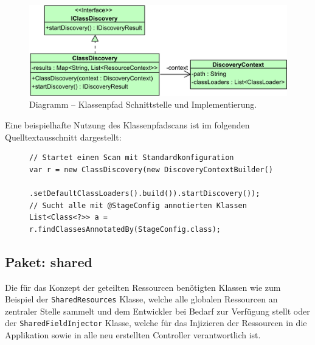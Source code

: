 \begin{figure}[H]
	\centering
	\includegraphics[width=\textwidth-2cm]{Abbildungen/Klassenpfadscan-Discovery.png}
	\caption{Diagramm -- Klassenpfad Schnittstelle und Implementierung.}
	\label{fig:classpath_interface}
\end{figure}
\noindent Eine beispielhafte Nutzung des Klassenpfadscans ist im folgenden Quelltextausschnitt dargestellt:
\begin{figure}[H]
	\begin{lstlisting}[caption=Beispiel -- Initiierung eines Klassenpfadscans., captionpos=b, label=lst:classpath_scan_usage]
// Startet einen Scan mit Standardkonfiguration
var r = new ClassDiscovery(new DiscoveryContextBuilder()
		.setDefaultClassLoaders().build()).startDiscovery());
// Sucht alle mit @StageConfig annotierten Klassen
List<Class<?>> a = r.findClassesAnnotatedBy(StageConfig.class);
	\end{lstlisting}
\end{figure}
\subsection{Paket: shared}
Die für das Konzept der geteilten Ressourcen benötigten Klassen wie zum Beispiel der \texttt{SharedResources} Klasse, welche alle globalen Ressourcen an zentraler Stelle sammelt und dem Entwickler bei Bedarf zur Verfügung stellt oder der \texttt{SharedFieldInjector} Klasse, welche für das Injizieren der Ressourcen in die Applikation sowie in alle neu erstellten Controller verantwortlich ist.
